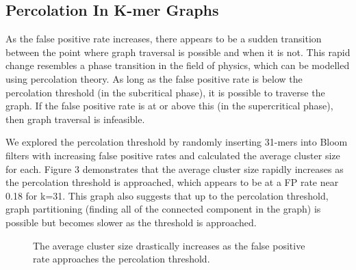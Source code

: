 \documentclass[12pt]{article} \usepackage{simplemargins}
\begin{document}
\subsection{Percolation In K-mer Graphs}
As the false positive rate increases, there appears to be a sudden
transition between the point where graph traversal is possible and
when it is not. This rapid change resembles a phase transition in the
field of physics, which can be modelled using percolation theory. As
long as the false positive rate is below the percolation threshold (in
the subcritical phase), it is possible to traverse the graph. If the
false positive rate is at or above this (in the supercritical phase), then graph
traversal is infeasible. 

We explored the percolation threshold by randomly inserting 31-mers into Bloom
filters with increasing false positive rates and calculated the average
cluster size for each. Figure 3 demonstrates that the average cluster
size rapidly increases as the percolation threshold is approached,
which appears to be at a FP rate near 0.18 for k=31. This
graph also suggests that up to the percolation threshold, graph
partitioning (finding all of the connected component in the graph) 
is possible but becomes slower as the threshold is
approached.

\begin{figure}
\caption{The average cluster size drastically increases as the false positive 
rate approaches the percolation threshold.
}
\end{figure}
\end{document}
